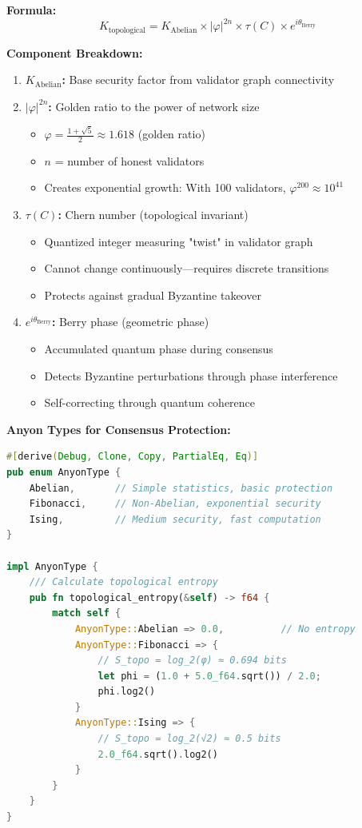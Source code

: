 \documentclass[11pt,a4paper]{article}
\begin{document}
\textbf{Formula:}
\[K_{\text{topological}} = K_{\text{Abelian}} \times |\varphi|^{2n} \times \tau(C) \times e^{i\theta_{\text{Berry}}}\]

\textbf{Component Breakdown:}

\begin{enumerate}[leftmargin=*]
\item \textbf{$K_{\text{Abelian}}$:} Base security factor from validator graph connectivity

\item \textbf{$|\varphi|^{2n}$:} Golden ratio to the power of network size
\begin{itemize}
    \item $\varphi = \frac{1 + \sqrt{5}}{2} \approx 1.618$ (golden ratio)
    \item $n$ = number of honest validators
    \item Creates exponential growth: With 100 validators, $\varphi^{200} \approx 10^{41}$
\end{itemize}

\item \textbf{$\tau(C)$:} Chern number (topological invariant)
\begin{itemize}
    \item Quantized integer measuring "twist" in validator graph
    \item Cannot change continuously—requires discrete transitions
    \item Protects against gradual Byzantine takeover
\end{itemize}

\item \textbf{$e^{i\theta_{\text{Berry}}}$:} Berry phase (geometric phase)
\begin{itemize}
    \item Accumulated quantum phase during consensus
    \item Detects Byzantine perturbations through phase interference
    \item Self-correcting through quantum coherence
\end{itemize}
\end{enumerate}

\textbf{Anyon Types for Consensus Protection:}

\begin{lstlisting}[language=Rust,caption={Topological Anyon Types}]
#[derive(Debug, Clone, Copy, PartialEq, Eq)]
pub enum AnyonType {
    Abelian,       // Simple statistics, basic protection
    Fibonacci,     // Non-Abelian, exponential security
    Ising,         // Medium security, fast computation
}

impl AnyonType {
    /// Calculate topological entropy
    pub fn topological_entropy(&self) -> f64 {
        match self {
            AnyonType::Abelian => 0.0,          // No entropy
            AnyonType::Fibonacci => {
                // S_topo = log_2(φ) ≈ 0.694 bits
                let phi = (1.0 + 5.0_f64.sqrt()) / 2.0;
                phi.log2()
            }
            AnyonType::Ising => {
                // S_topo = log_2(√2) ≈ 0.5 bits
                2.0_f64.sqrt().log2()
            }
        }
    }
}
\end{lstlisting}
\end{document}
